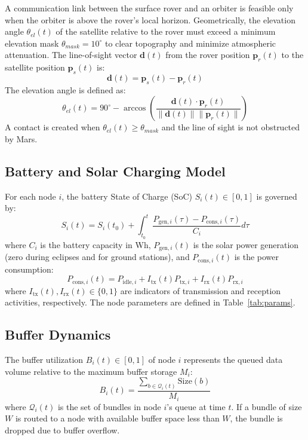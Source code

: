 \documentclass[a4paper,fleqn]{cas-dc}
\begin{document}
A communication link between the surface rover and an orbiter is feasible only when the orbiter is above the rover's local horizon. Geometrically, the elevation angle $\theta_{el}(t)$ of the satellite relative to the rover must exceed a minimum elevation mask $\theta_{mask} = 10^\circ$ to clear topography and minimize atmospheric attenuation. The line-of-sight vector $\mathbf{d}(t)$ from the rover position $\mathbf{p}_r(t)$ to the satellite position $\mathbf{p}_s(t)$ is:
\begin{equation}
    \mathbf{d}(t) = \mathbf{p}_s(t) - \mathbf{p}_r(t)
\end{equation}
The elevation angle is defined as:
\begin{equation}
    \theta_{el}(t) = 90^\circ - \arccos\left(\frac{\mathbf{d}(t) \cdot \mathbf{p}_r(t)}{\|\mathbf{d}(t)\| \|\mathbf{p}_r(t)\|}\right)
\end{equation}
A contact is created when $\theta_{el}(t) \geq \theta_{mask}$ and the line of sight is not obstructed by Mars.

\subsection{Battery and Solar Charging Model}
For each node $i$, the battery State of Charge (SoC) $S_i(t) \in [0, 1]$ is governed by:
\begin{equation}
    S_i(t) = S_i(t_0) + \int_{t_0}^t \frac{P_{\text{gen},i}(\tau) - P_{\text{cons},i}(\tau)}{C_i} d\tau
\end{equation}
where $C_i$ is the battery capacity in Wh, $P_{\text{gen},i}(t)$ is the solar power generation (zero during eclipses and for ground stations), and $P_{\text{cons},i}(t)$ is the power consumption:
\begin{equation}
    P_{\text{cons},i}(t) = P_{\text{idle},i} + I_{\text{tx}}(t) P_{\text{tx},i} + I_{\text{rx}}(t) P_{\text{rx},i}
\end{equation}
where $I_{\text{tx}}(t), I_{\text{rx}}(t) \in \{0, 1\}$ are indicators of transmission and reception activities, respectively. The node parameters are defined in Table~\ref{tab:params}.

\subsection{Buffer Dynamics}
The buffer utilization $B_i(t) \in [0, 1]$ of node $i$ represents the queued data volume relative to the maximum buffer storage $M_i$:
\begin{equation}
    B_i(t) = \frac{\sum_{b \in \mathcal{Q}_i(t)} \text{Size}(b)}{M_i}
\end{equation}
where $\mathcal{Q}_i(t)$ is the set of bundles in node $i$'s queue at time $t$. If a bundle of size $W$ is routed to a node with available buffer space less than $W$, the bundle is dropped due to buffer overflow.
\end{document}
